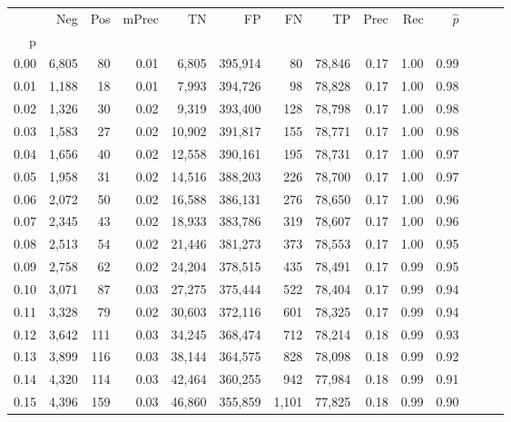\begin{tabular}{rrrrrrrrrrrrrr}
\toprule
{} &    Neg &    Pos & mPrec &       TN &       FP &      FN &      TP &  Prec &   Rec & $\hat{p}$ \\
p    &        &        &       &          &          &         &         &       &       &           \\
\midrule
0.00 &  6,805 &     80 &  0.01 &    6,805 &  395,914 &      80 &  78,846 &  0.17 &  1.00 &      0.99 \\
0.01 &  1,188 &     18 &  0.01 &    7,993 &  394,726 &      98 &  78,828 &  0.17 &  1.00 &      0.98 \\
0.02 &  1,326 &     30 &  0.02 &    9,319 &  393,400 &     128 &  78,798 &  0.17 &  1.00 &      0.98 \\
0.03 &  1,583 &     27 &  0.02 &   10,902 &  391,817 &     155 &  78,771 &  0.17 &  1.00 &      0.98 \\
0.04 &  1,656 &     40 &  0.02 &   12,558 &  390,161 &     195 &  78,731 &  0.17 &  1.00 &      0.97 \\
0.05 &  1,958 &     31 &  0.02 &   14,516 &  388,203 &     226 &  78,700 &  0.17 &  1.00 &      0.97 \\
0.06 &  2,072 &     50 &  0.02 &   16,588 &  386,131 &     276 &  78,650 &  0.17 &  1.00 &      0.96 \\
0.07 &  2,345 &     43 &  0.02 &   18,933 &  383,786 &     319 &  78,607 &  0.17 &  1.00 &      0.96 \\
0.08 &  2,513 &     54 &  0.02 &   21,446 &  381,273 &     373 &  78,553 &  0.17 &  1.00 &      0.95 \\
0.09 &  2,758 &     62 &  0.02 &   24,204 &  378,515 &     435 &  78,491 &  0.17 &  0.99 &      0.95 \\
0.10 &  3,071 &     87 &  0.03 &   27,275 &  375,444 &     522 &  78,404 &  0.17 &  0.99 &      0.94 \\
0.11 &  3,328 &     79 &  0.02 &   30,603 &  372,116 &     601 &  78,325 &  0.17 &  0.99 &      0.94 \\
0.12 &  3,642 &    111 &  0.03 &   34,245 &  368,474 &     712 &  78,214 &  0.18 &  0.99 &      0.93 \\
0.13 &  3,899 &    116 &  0.03 &   38,144 &  364,575 &     828 &  78,098 &  0.18 &  0.99 &      0.92 \\
0.14 &  4,320 &    114 &  0.03 &   42,464 &  360,255 &     942 &  77,984 &  0.18 &  0.99 &      0.91 \\
0.15 &  4,396 &    159 &  0.03 &   46,860 &  355,859 &   1,101 &  77,825 &  0.18 &  0.99 &      0.90 \\

\end{tabular}
